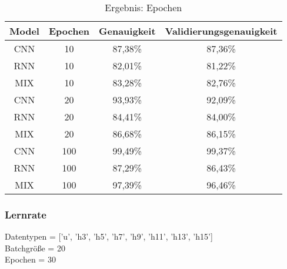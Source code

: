         \begin{table}[H]
            \centering
            \begin{tabular}{|c|c|c|c|}
                \hline
                Model & Epochen & Genauigkeit & Validierungsgenauigkeit \\
                \hline
                CNN & 10 &  87,38\% & 87,36\%  \\ 
                \hline
                RNN & 10 &  82,01\% & 81,22\%  \\ 
                \hline
                MIX & 10 &  83,28\% & 82,76\% \\ 
                \hline
                \hline
                CNN & 20 &  93,93\% & 92,09\%  \\ 
                \hline
                RNN & 20 &  84,41\% & 84,00\% \\ 
                \hline
                MIX & 20 &  86,68\% & 86,15\%  \\ 
                \hline
                \hline
                CNN & 100 & 99,49\% & 99,37\%  \\ 
                \hline
                RNN & 100 & 87,29\% & 86,43\%  \\ 
                \hline
                MIX & 100 & 97,39\% & 96,46\% \\
                \hline

            \end{tabular}
            \caption{Ergebnis: Epochen}
            \label{tabl:ErgebnisEpoch}
        \end{table}

    \subsubsection{Lernrate}

        Datentypen = ['u', 'h3', 'h5', 'h7', 'h9', 'h11', 'h13', 'h15']\\
        \noindent
        Batchgröße = 20\\
        \noindent
        Epochen = 30\\

